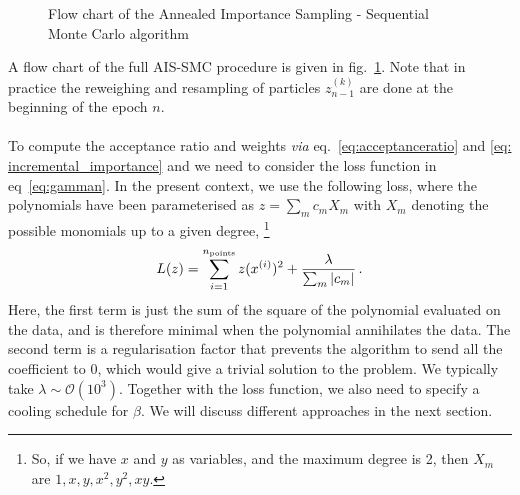 \documentclass[11pt,a4paper]{article}
\begin{document}
\begin{figure}[h!]
\begin{minipage}{15cm}
\begin{tcolorbox}
				\end{tcolorbox}
			\end{minipage}
			\caption{Flow chart of the Annealed Importance Sampling - Sequential Monte Carlo algorithm}
			\label{ASMCflowchart}
		\end{figure}

	A flow chart of the full AIS-SMC procedure is given in fig.~\ref{ASMCflowchart}. Note that in practice the reweighing and resampling of particles $z_{n-1}^{(k)}$ are done at the beginning of the epoch $n$.

	\paragraph{}
	To compute the acceptance ratio and weights \textit{via} eq.~\eqref{eq:acceptanceratio} and \eqref{eq: incremental_importance} and we need to consider the loss function in eq~\eqref{eq:gamman}.
	In the present context, we use the following loss, where the polynomials have been parameterised as $z = \sum_m c_m X_m$ with $X_m$ denoting the possible monomials up to a given degree,%
	\footnote{So, if we have $x$ and $y$ as variables, and the maximum degree is 2, then $X_m$ are $1, x, y, x^2, y^2, x y$.}
	\begin{equation} \label{eq:lossreg}
		L(z) = \sum_{i=1}^{n_{\rm points}} z(x^{(i)})^2 + \frac{\lambda}{\sum_m |c_m|}\,.
	\end{equation}
	Here, the first term is just the sum of the square of the polynomial evaluated on the data, and is therefore minimal when the polynomial annihilates the data. 
	The second term is a regularisation factor that prevents the algorithm to send all the coefficient to 0, which would give a trivial solution to the problem. 
	We typically take $\lambda \sim \mathcal{O}(10^3)$. 
	Together with the loss function, we also need to specify a cooling schedule for $\beta$. We will discuss different approaches in the next section.
	
\end{document}
